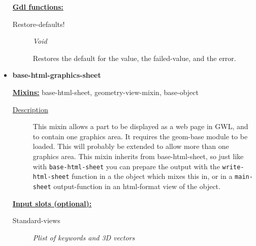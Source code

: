 \documentclass [11pt]{book}
\begin{document}
\begin{itemize}
\begin{description}
\end{description}






\textbf{
\underline{Gdl functions:}}

\begin{description}

\item [Restore-defaults!]
\emph{Void}

 Restores the default for the value, the failed-value, and the error.




\end{description}







\item {}
\label{prim:base-html-graphics-sheet}
\textbf{base-html-graphics-sheet}


\textbf{
\underline{Mixins:}} base-html-sheet, geometry-view-mixin, base-object





\begin{description}

\item [
\underline{Description}]


This mixin allows a part to be displayed as a web page in GWL, and
to contain one graphics area. It requires the geom-base module to be loaded. This will 
probably be extended to allow more than one graphics area. This mixin inherits from 
base-html-sheet, so just like with \texttt{base-html-sheet} you can prepare the output 
with the \texttt{write-html-sheet} function  in a the object which mixes  this in, or 
in a \texttt{main-sheet} output-function in an html-format view of the object.






\end{description}








\textbf{
\underline{Input slots (optional):}}

\begin{description}

\item [Standard-views]
\emph{Plist of keywords and 3D vectors}


\end{description}
\end{itemize}
\end{document}
